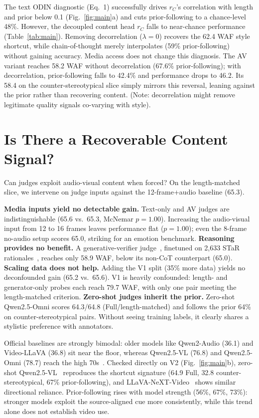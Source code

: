\documentclass[sigconf,screen]{acmart}
\newcommand{\waf}{WAF\xspace}
\begin{document}
The text ODIN diagnostic (Eq.~1) successfully drives $r_C$'s correlation with length and prior below 0.1 (Fig.~\ref{fig:main}a) and cuts prior-following to a chance-level 48\%. However, the decoupled content head $r_C$ falls to near-chance performance (Table~\ref{tab:main}). Removing decorrelation ($\lambda{=}0$) recovers the 62.4 \waf style shortcut, while chain-of-thought merely interpolates (59\% prior-following) without gaining accuracy. Media access does not change this diagnosis. The AV variant reaches 58.2 \waf without decorrelation (67.6\% prior-following); with decorrelation, prior-following falls to 42.4\% and performance drops to 46.2. Its 58.4 on the counter-stereotypical slice simply mirrors this reversal, leaning against the prior rather than recovering content. (Note: decorrelation might remove legitimate quality signals co-varying with style).

\section{Is There a Recoverable Content Signal?}
\label{sec:negatives}
Can judges exploit audio-visual content when forced? On the length-matched slice, we intervene on judge inputs against the 12-frame+audio baseline (65.3).

\textbf{Media inputs yield no detectable gain.} Text-only and AV judges are indistinguishable (65.6 vs.\ 65.3, McNemar $p = 1.00$). Increasing the audio-visual input from 12 to 16 frames leaves performance flat ($p = 1.00$); even the 8-frame no-audio setup scores 65.0, striking for an emotion benchmark.
\textbf{Reasoning provides no benefit.} A generative-verifier judge~\cite{zhang2025generative}, finetuned on 2,633 STaR rationales~\cite{zelikman2022star}, reaches only 58.9 \waf, below its non-CoT counterpart (65.0).
\textbf{Scaling data does not help.} Adding the V1 split (35\% more data) yields no deconfounded gain (65.2 vs.\ 65.6). V1 is heavily confounded: length- and generator-only probes each reach 79.7 \waf, with only one pair meeting the length-matched criterion.
\textbf{Zero-shot judges inherit the prior.} Zero-shot Qwen2.5-Omni scores 64.3/64.8 (Full/length-matched) and follows the prior 64\% on counter-stereotypical pairs. Without seeing training labels, it clearly shares a stylistic preference with annotators.

Official baselines are strongly bimodal: older models like Qwen2-Audio (36.1) and Video-LLaVA (36.8) sit near the floor, whereas Qwen2.5-VL (76.8) and Qwen2.5-Omni (78.7) reach the high 70s~\cite{lian2026mer}. Checked directly on V2 (Fig.~\ref{fig:main}b), zero-shot Qwen2.5-VL~\cite{bai2025qwen25vltechnicalreport} reproduces the shortcut signature (64.9 Full, 32.8 counter-stereotypical, 67\% prior-following), and LLaVA-NeXT-Video~\cite{zhang2024llavanextvideo} shows similar directional reliance. Prior-following rises with model strength (56\%, 67\%, 73\%): stronger models exploit the source-aligned cue more consistently, while this trend alone does not establish video use.
\end{document}
